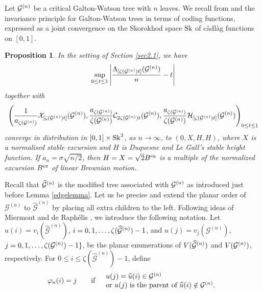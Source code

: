\documentclass[11pt,a4paper]{article}
\newtheorem{prop}{Proposition}[section]
\newcommand{\cG}{\mathcal{G}}
\begin{document}
Let ${\cal G}^{(n)}$ be a critical Galton-Watson tree with $n$ leaves. We recall from \cite[Theorem 8.1]{Kor12} and \cite[Theorem 3.3]{Kor14} the invariance principle 
for Galton-Watson trees in terms of coding functions, expressed as a joint convergence on the Skorokhod space ${\rm Sk}$ of c\`adl\`ag functions on $[0,1]$.
\begin{prop}
\label{TheK12} In the setting of Section \ref{sec2.1}, we have  
\begin{equation}
 \sup_{0\leq t\leq 1}\left|\frac{\Lambda_{[ \zeta({\cal G}^{(n)}) t]}({\cal G}^{(n)} )}{ n}-t\right|\vspace{-0.3cm}
 \end{equation}
 together with\vspace{-0.1cm}
 \begin{eqnarray}
\left(\frac{1}{ a_{\zeta( {\cal G}^{(n)})} }{\cal X}_{ [ \zeta( {\cal G}^{(n)}) t]}( {\cal G}^{(n)} ),
\frac{a_{\zeta( {\cal G}^{(n)})}}{ \zeta( {\cal G}^{(n)}) }{\cal C}_{ 2 \zeta( {\cal G}^{(n)}) t}({\cal G}^{(n)} ),
\frac{a_{\zeta( {\cal G}^{(n)})}}{ \zeta( {\cal G}^{(n)}) }{\cal H}_{ [\zeta( {\cal G}^{(n)}) t]}({\cal G}^{(n)} )
\right)_{0\leq t\leq 1}\end{eqnarray}
converge in distribution in $[0,1]\times{\rm Sk}^3$, as $n\rightarrow\infty$, to $(0, X, H, H)$, 
where $X$ is a normalised stable excursion and $H$ is Duquesne and Le Gall's \cite{DuLG} stable height function. If $a_n=\sigma\sqrt{n/2}$, then $H=X=\sqrt{2}B^{\rm ex}$ is a multiple of the normalized excursion $B^{\rm ex}$ of linear Brownian motion.
\end{prop}
Recall that $\widehat{{\cal G}}^{(n)}$ is the modified  tree associated with  ${\cal G}^{(n)}$ as introduced just before Lemma \ref{edgelemma}. Let us be precise and 
extend the planar order of $\cG^{(n)}$ to $\widehat{\cG}^{(n)}$ by placing all extra children to the left. Following ideas of Miermont \cite{Mie08} and de Raph\'elis \cite{deR15}, we introduce the following notation.
Let $\widehat{u}(i)=v_i(\widehat{\cG}^{(n)})$, $i=0, 1,\ldots, \zeta(\widehat{{\cal G}}^{(n)})-1$, and ${u}(j)=v_j(\cG^{(n)})$, $j=0,1, \ldots, \zeta({{\cal G}}^{(n)})-1\}$, be the planar enumerations of $V(\widehat{{\cal G}}^{(n)})$ and $V({{\cal G}}^{(n)})$, respectively.
For $0\le i\le\zeta(\widehat{\cG}^{(n)})-1$, define
\begin{eqnarray}
\varphi_n(i)=j\qquad\mbox{if}\quad%
\begin{array}{l}u(j)=\widehat{u}(i)\in {\cal G}^{(n)} \\
 \mbox{or }u(j)\text{ is the parent of }\widehat{u}(i)\notin{\cal G}^{(n)}.
\end{array} %
\end{eqnarray}
\end{document}
